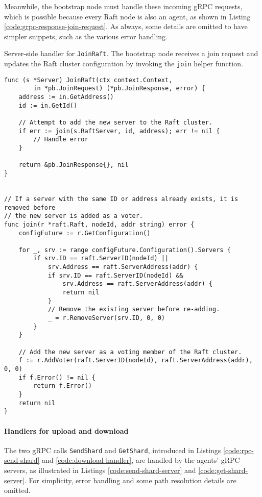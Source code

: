 Meanwhile, the bootstrap node must handle these incoming gRPC requests, which is possible because every Raft node is also an agent, as shown in Listing \ref{code:grpc-response-join-request}. As always, some details are omitted to have simpler snippets, such as the various error handling.

\begin{listing}[H]
\caption{Server-side handler for \texttt{JoinRaft}. The bootstrap node receives a join request and updates the Raft cluster configuration by invoking the \texttt{join} helper function.}
\label{code:grpc-response-join-request}
\begin{verbatim}
func (s *Server) JoinRaft(ctx context.Context,
        in *pb.JoinRequest) (*pb.JoinResponse, error) {
    address := in.GetAddress()
    id := in.GetId()

    // Attempt to add the new server to the Raft cluster.
    if err := join(s.RaftServer, id, address); err != nil {
        // Handle error
    }

    return &pb.JoinResponse{}, nil
}


// If a server with the same ID or address already exists, it is removed before
// the new server is added as a voter.
func join(r *raft.Raft, nodeId, addr string) error {
    configFuture := r.GetConfiguration()

    for _, srv := range configFuture.Configuration().Servers {
        if srv.ID == raft.ServerID(nodeId) ||
            srv.Address == raft.ServerAddress(addr) {
            if srv.ID == raft.ServerID(nodeId) &&
                srv.Address == raft.ServerAddress(addr) {
                return nil
            }
            // Remove the existing server before re-adding.
            _ = r.RemoveServer(srv.ID, 0, 0)
        }
    }

    // Add the new server as a voting member of the Raft cluster.
    f := r.AddVoter(raft.ServerID(nodeId), raft.ServerAddress(addr), 0, 0)
    if f.Error() != nil {
        return f.Error()
    }
    return nil
}
\end{verbatim}
\end{listing}
\paragraph{Handlers for upload and download}

The two gRPC calls \texttt{SendShard} and \texttt{GetShard}, introduced in Listings \ref{code:rpc-send-shard} and \ref{code:download-handler}, are handled by the agents’ gRPC servers, as illustrated in Listings \ref{code:send-shard-server} and \ref{code:get-shard-server}. For simplicity, error handling and some path resolution details are omitted.

